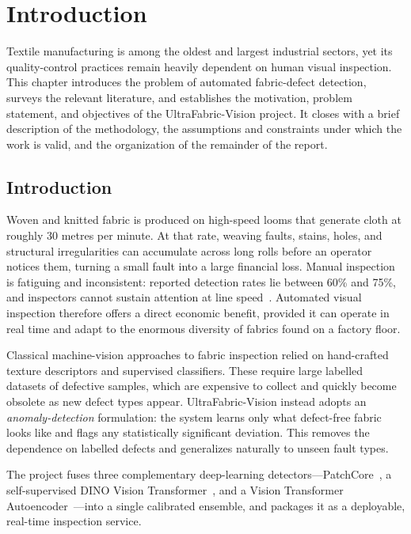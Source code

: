 \chapter{Introduction}

Textile manufacturing is among the oldest and largest industrial sectors, yet its quality-control practices remain heavily dependent on human visual inspection. This chapter introduces the problem of automated fabric-defect detection, surveys the relevant literature, and establishes the motivation, problem statement, and objectives of the UltraFabric-Vision project. It closes with a brief description of the methodology, the assumptions and constraints under which the work is valid, and the organization of the remainder of the report.

\section[Introduction]{\textbf{Introduction}}

Woven and knitted fabric is produced on high-speed looms that generate cloth at roughly 30 metres per minute. At that rate, weaving faults, stains, holes, and structural irregularities can accumulate across long rolls before an operator notices them, turning a small fault into a large financial loss. Manual inspection is fatiguing and inconsistent: reported detection rates lie between 60\% and 75\%, and inspectors cannot sustain attention at line speed~\cite{kumar2019survey}. Automated visual inspection therefore offers a direct economic benefit, provided it can operate in real time and adapt to the enormous diversity of fabrics found on a factory floor.

Classical machine-vision approaches to fabric inspection relied on hand-crafted texture descriptors and supervised classifiers. These require large labelled datasets of defective samples, which are expensive to collect and quickly become obsolete as new defect types appear. UltraFabric-Vision instead adopts an \emph{anomaly-detection} formulation: the system learns only what defect-free fabric looks like and flags any statistically significant deviation. This removes the dependence on labelled defects and generalizes naturally to unseen fault types.

The project fuses three complementary deep-learning detectors---PatchCore~\cite{roth2022patchcore}, a self-supervised DINO Vision Transformer~\cite{caron2021dino}, and a Vision Transformer Autoencoder~\cite{dosovitskiy2021vit}---into a single calibrated ensemble, and packages it as a deployable, real-time inspection service.

